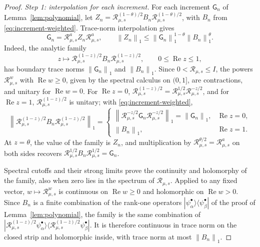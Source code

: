 \documentclass[11pt]{amsart}
\numberwithin{equation}{section}
\theoremstyle{definition}
\newcommand{\JointRes}{\mathcal R}
\newcommand{\Rea}{\operatorname{Re}}
\newcommand{\norm}[1]{\left\|#1\right\|}
\begin{document}
\begin{proof}
\emph{Step 1: interpolation for each increment.} For each increment
\(\mathsf G_n\) of Lemma~\ref{lem:polynomial}, let
\(Z_n=\JointRes_{\mu,s}^{(1-\theta)/2}B_n\JointRes_{\mu,s}^{(1-\theta)/2}\),
with \(B_n\) from \eqref{eq:increment-weighted}. Trace-norm interpolation
gives
\begin{equation}
 \mathsf G_n
 =\JointRes_{\mu,s}^{a}Z_n\JointRes_{\mu,s}^{a},
 \qquad
 \norm{Z_n}_1
 \le\norm{\mathsf G_n}_1^{1-\theta}\norm{B_n}_1^\theta.
 \label{eq:interpolation}
\end{equation}
Indeed, the analytic family
\[
 z\longmapsto
 \JointRes_{\mu,s}^{(1-z)/2}
 B_n
 \JointRes_{\mu,s}^{(1-z)/2},
 \qquad 0\le\Rea z\le1,
\]
has boundary trace norms \(\norm{\mathsf G_n}_1\) and
\(\norm{B_n}_1\). Since
\(0<\JointRes_{\mu,s}\le I\), the powers \(\JointRes_{\mu,s}^w\) with
\(\Rea w\ge0\), given by the spectral calculus on \((0,1]\), are
contractions, and unitary for \(\Rea w=0\). For \(\Rea z=0\),
\(\JointRes_{\mu,s}^{(1-z)/2}
=\JointRes_{\mu,s}^{1/2}\JointRes_{\mu,s}^{-z/2}\), and for
\(\Rea z=1\), \(\JointRes_{\mu,s}^{(1-z)/2}\) is unitary; with
\eqref{eq:increment-weighted},
\[
 \norm{\JointRes_{\mu,s}^{(1-z)/2}B_n\JointRes_{\mu,s}^{(1-z)/2}}_1
 =\begin{cases}
 \norm{\JointRes_{\mu,s}^{-z/2}\mathsf G_n\JointRes_{\mu,s}^{-z/2}}_1
 =\norm{\mathsf G_n}_1, & \Rea z=0,\\
 \norm{B_n}_1, & \Rea z=1.
 \end{cases}
\]
At \(z=\theta\), the value of the family is \(Z_n\), and
multiplication by \(\JointRes_{\mu,s}^{\theta/2}=\JointRes_{\mu,s}^a\)
on both sides recovers
\(\JointRes_{\mu,s}^{1/2}B_n\JointRes_{\mu,s}^{1/2}=\mathsf G_n\).

Spectral cutoffs and their strong limits prove the continuity and
holomorphy of the family, also when zero lies in the spectrum of
\(\JointRes_{\mu,s}\). Applied to any fixed vector,
\(w\mapsto\JointRes_{\mu,s}^w\) is continuous on \(\Rea w\ge0\) and
holomorphic on \(\Rea w>0\). Since
\(B_n\) is a finite combination of the rank-one operators
\(|\psi^\bullet_\alpha\rangle\langle\psi^\bullet_\beta|\) of the proof
of Lemma~\ref{lem:polynomial}, the family is the same combination of
\(|\JointRes_{\mu,s}^{(1-z)/2}\psi^\bullet_\alpha\rangle
\langle\JointRes_{\mu,s}^{(1-\bar z)/2}\psi^\bullet_\beta|\). It is
therefore continuous in trace norm on the closed strip and holomorphic
inside, with trace norm at most \(\norm{B_n}_1\).


\end{proof}
\end{document}
